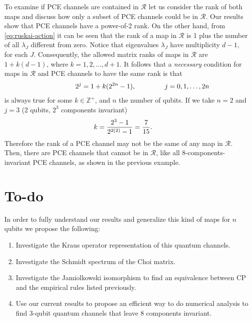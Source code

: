 \documentclass[11pt,dvipsnames]{article} %
\newcommand{\1}{\mathds{1}}
\newcommand{\R}{\mathcal{R}}
\begin{document}
To examine if PCE channels are contained in $\R$ let us consider
the rank of both maps and discuss how only a subset of PCE channels
could be in $\R$. Our results show that PCE channels have 
a power-of-2 rank. On the other hand, from \eqref{eq:ruskai-action} it
can be seen that the rank of a map in $\R$ is 1 plus 
the number of all $\lambda_J$ different from zero. Notice that eigenvalues $\lambda_J$ have multiplicity $d-1$, for each $J$. Consequently, the allowed matrix ranks 
of maps in $\R$ are $1 + k(d-1)$, where $k = 1,2,\ldots,d+1$. It follows
that a \textit{necessary} condition for maps in $\R$ and PCE channels to have the 
same rank is that
\begin{align}
	\hspace{2cm}2^j&=1 + k(2^{2n}-1),	\hspace{1.5cm} j=0,1,\ldots,2n
\end{align}
is always true for some $k\in \mathbb{Z^+}$, and $n$ the number 
of qubits. If we take $n=2$ and $j=3$ 
(2 qubits, $2^3$ components invariant)
\begin{align}
	k&= \frac{2^3-1}{2^{2\qty(2)}-1}=\frac{7}{15}.
\end{align}
Therefore the rank of a PCE channel may not be the same of any map in $\R$.
Then, there are PCE channels that cannot be in $\R$, like
all 8-components-invariant PCE channels, as shown in the previous example. 


\section*{To-do} %
In order to fully understand our results and generalize this kind of maps 
for $n$ qubits we propose the following:
\begin{enumerate}
\item Investigate the Kraus operator representation of this quantum channels.
\item Investigate the Schmidt spectrum of the Choi matrix.
\item Investigate the Jamiolkowski isomorphism to find an equivalence between
CP and the empirical rules listed previously.
\item Use our current results to propose an efficient way to do numerical
analysis to find 3-qubit quantum channels that leave 8 components invariant.
\end{enumerate}


\vfill
\end{document}
